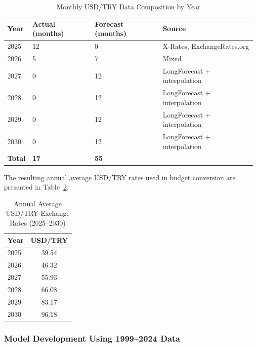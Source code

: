 \documentclass[final, 9pt, twocolumn]{saucis}
\begin{document}
\begin{table}[h]
\centering
\caption{Monthly USD/TRY Data Composition by Year}
\label{tab:usdtry_sources}
\begin{tabular}{p{1cm} p{1cm} p{1cm} p{4cm}}
\hline
\textbf{Year} & \textbf{Actual (months)} & \textbf{Forecast (months)} & \textbf{Source} \\
\hline
2025 & 12 & 0  & X-Rates, ExchangeRates.org \\
2026 & 5  & 7  & Mixed \\
2027 & 0  & 12 & LongForecast + interpolation \\
2028 & 0  & 12 & LongForecast + interpolation \\
2029 & 0  & 12 & LongForecast + interpolation \\
2030 & 0  & 12 & LongForecast + interpolation \\
\hline
\textbf{Total} & \textbf{17} & \textbf{55} & \\
\hline
\end{tabular}
\end{table}

The resulting annual average USD/TRY rates used in budget conversion are presented in Table~\ref{tab:usdtry_annual}.

\begin{table}[h]
\centering
\caption{Annual Average USD/TRY Exchange Rates (2025--2030)}
\label{tab:usdtry_annual}
\begin{tabular}{lc}
\hline
\textbf{Year} & \textbf{USD/TRY} \\
\hline
2025 & 39.54 \\
2026 & 46.32 \\
2027 & 55.93 \\
2028 & 66.08 \\
2029 & 83.17 \\
2030 & 96.18 \\
\hline
\end{tabular}
\end{table}

\subsubsection{Model Development Using 1999--2024 Data}
\end{document}
